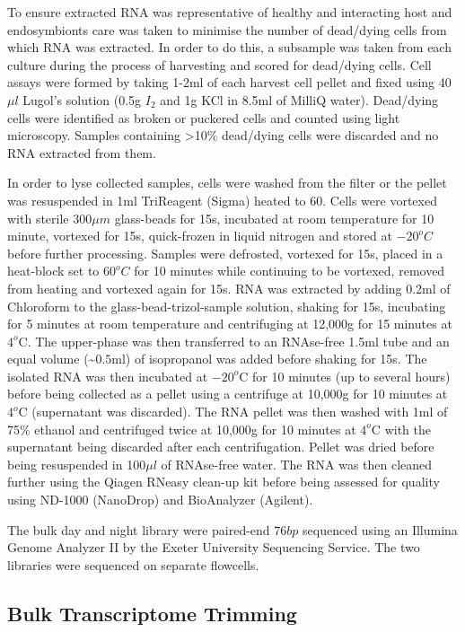 To ensure extracted RNA was representative of healthy and interacting host 
and endosymbionts care was taken to minimise the number of dead/dying cells 
from which RNA was extracted.  In order to do this, a subsample was taken 
from each culture during the process of harvesting and scored for dead/dying cells.  
Cell assays were formed by taking 1-2ml of each harvest cell pellet and 
fixed using 40\(\mu l\) Lugol's solution (0.5g \(I_{2}\) and 1g KCl in 8.5ml 
of MilliQ water). Dead/dying cells were identified as broken or puckered cells 
and counted using light microscopy.  Samples containing >10\% dead/dying cells 
were discarded and no RNA extracted from them.

In order to lyse collected samples, cells were washed from the filter or the 
pellet was resuspended in 1ml TriReagent (Sigma) heated to \(60\)\celsius. 
Cells were vortexed with sterile \(300\mu m\) glass-beads for 15s, incubated at 
room temperature for 10 minute, vortexed for 15s, quick-frozen in liquid 
nitrogen and stored at \(-20^{o}C\) before further processing.  
Samples were defrosted, vortexed for 15s, placed in a heat-block set 
to \(60^{o}C\) for 10 minutes while continuing to be vortexed, removed from 
heating and vortexed again for 15s.  
RNA was extracted by adding 0.2ml of Chloroform to the glass-bead-trizol-sample 
solution, shaking for 15s, incubating for 5 minutes at room temperature and 
centrifuging at 12,000g for 15 minutes at $4^{o}$C.  
The upper-phase was then transferred to an RNAse-free 1.5ml tube and an 
equal volume (\textasciitilde$0.5$ml) of isopropanol was added before shaking for 15s.  
The isolated RNA was then incubated at $-20^{o}$C for 10 minutes 
(up to several hours) before being collected as a pellet using a centrifuge at 
10,000g for 10 minutes at $4^{o}$C (supernatant was discarded). 
The RNA pellet was then washed with 1ml of 75\% ethanol and centrifuged 
twice at 10,000g for 10 minutes at $4^{o}$C with the supernatant being 
discarded after each centrifugation.  
Pellet was dried before being resuspended in 100$\mu l$ of RNAse-free water.  
The RNA was then cleaned further using the Qiagen RNeasy clean-up kit 
before being assessed for quality using ND-1000 (NanoDrop) and BioAnalyzer (Agilent).

The bulk day and night library were paired-end \(76bp\) sequenced using an Illumina Genome
Analyzer II by the Exeter University Sequencing Service.  The two libraries were sequenced
on separate flowcells.

\subsection{Bulk Transcriptome Trimming}

